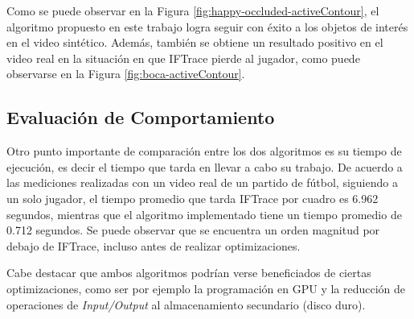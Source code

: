 Como se puede observar en la Figura \ref{fig:happy-occluded-activeContour}, el
algoritmo propuesto en este trabajo logra seguir con éxito a los objetos de
interés en el video sintético. Además, también se obtiene un resultado positivo
en el video real en la situación en que IFTrace pierde al jugador, como puede
observarse en la Figura \ref{fig:boca-activeContour}.

\subsection{Evaluación de Comportamiento}

Otro punto importante de comparación entre los dos algoritmos es su tiempo de
ejecución, es decir el tiempo que tarda en llevar a cabo su trabajo.  De
acuerdo a las mediciones realizadas con un video real de un partido de fútbol,
siguiendo a un solo jugador, el tiempo promedio que tarda IFTrace por cuadro es
6.962 segundos, mientras que el algoritmo implementado tiene un tiempo promedio
de 0.712 segundos. Se puede observar que se encuentra un orden magnitud por
debajo de IFTrace, incluso antes de realizar optimizaciones.

Cabe destacar que ambos algoritmos podrían verse beneficiados de ciertas
optimizaciones, como ser por ejemplo la programación en GPU y la reducción de
operaciones de \textit{Input/Output} al almacenamiento secundario (disco duro).
